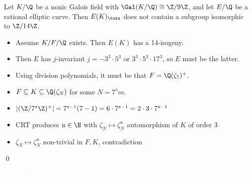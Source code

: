 \begin{frame}[plain]
\begin{prop}
Let $K/\Q$ be a nonic Galois field with $\Gal(K/\Q) \cong \Z/9\Z$, and let $E/\Q$ be a rational elliptic curve. Then $E(K)_\tors$ does not contain a subgroup isomorphic to $\Z/14\Z$.
\end{prop} \pause

\pfsk
\begin{itemize}
\item Assume $K/F/\Q$ exists. Then $E(K)$ has a 14-isogeny. \pause
\item Then $E$ has $j$-invariant $j= -3^3 \cdot 5^3$ or $3^3 \cdot 5^3 \cdot 17^3$, so $E$ must be the latter. \pause
\item Using division polynomials, it must be that $F= \Q(\zeta_7)^+$. \pause
\item $F \subseteq K \subseteq \Q(\zeta_N)$ for some $N= 7^sm$. \pause
\item $|(\Z/7^s\Z)^\times|= 7^{s-1} (7-1)= 6 \cdot 7^{s-1}= 2 \cdot 3 \cdot 7^{s-1}$  \pause
\item CRT produces $u \in \N$ with $\zeta_N \mapsto \zeta_N^u$ automorphism of $K$ of order 3 \pause
\item $\zeta_N \mapsto \zeta_N^u$ non-trivial in $F, K$, contradiction
\end{itemize}
\qed 
\end{frame}



\begingroup
{}
\begin{frame}[plain]
\phantom{x} \vfill
\begin{center} {\huge \textcolor{white}{Questions?}} \end{center}
\vfill
\end{frame}
\endgroup
